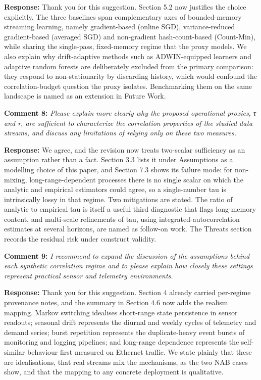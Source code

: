 \documentclass[
  11pt,
]{article}
\begin{document}
\textbf{Response:} Thank you for this suggestion. Section 5.2 now
justifies the choice explicitly. The three baselines span complementary
axes of bounded-memory streaming learning, namely gradient-based (online
SGD), variance-reduced gradient-based (averaged SGD) and non-gradient
hash-count-based (Count-Min), while sharing the single-pass,
fixed-memory regime that the proxy models. We also explain why
drift-adaptive methods such as ADWIN-equipped learners and adaptive
random forests are deliberately excluded from the primary comparison:
they respond to non-stationarity by discarding history, which would
confound the correlation-budget question the proxy isolates.
Benchmarking them on the same landscape is named as an extension in
Future Work.

\textbf{Comment 8:} \emph{Please explain more clearly why the proposed
operational proxies, τ and r, are sufficient to characterize the
correlation properties of the studied data streams, and discuss any
limitations of relying only on these two measures.}

\textbf{Response:} We agree, and the revision now treats two-scalar
sufficiency as an assumption rather than a fact. Section 3.3 lists it
under Assumptions as a modelling choice of this paper, and Section 7.3
shows its failure mode: for non-mixing, long-range-dependent processes
there is no single scalar on which the analytic and empirical estimators
could agree, so a single-number tau is intrinsically lossy in that
regime. Two mitigations are stated. The ratio of analytic to empirical
tau is itself a useful third diagnostic that flags long-memory content,
and multi-scale refinements of tau, using integrated-autocorrelation
estimates at several horizons, are named as follow-on work. The Threats
section records the residual risk under construct validity.

\textbf{Comment 9:} \emph{I recommend to expand the discussion of the
assumptions behind each synthetic correlation regime and to please
explain how closely these settings represent practical sensor and
telemetry environments.}

\textbf{Response:} Thank you for this suggestion. Section 4 already
carried per-regime provenance notes, and the summary in Section 4.6 now
adds the realism mapping. Markov switching idealises short-range state
persistence in sensor readouts; seasonal drift represents the diurnal
and weekly cycles of telemetry and demand series; burst repetition
represents the duplicate-heavy event bursts of monitoring and logging
pipelines; and long-range dependence represents the self-similar
behaviour first measured on Ethernet traffic. We state plainly that
these are idealisations, that real streams mix the mechanisms, as the
two NAB cases show, and that the mapping to any concrete deployment is
qualitative.
\end{document}
